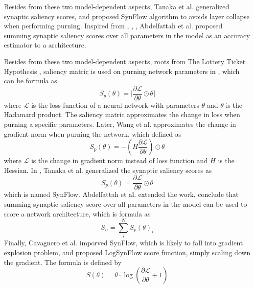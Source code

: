 \documentclass[sigconf]{acmart}
\begin{document}
    Besides from these two model-dependent aspects, Tanaka et al. \cite{tanaka2020pruning} 
    generalized synaptic saliency scores, and proposed SynFlow algorithm to avoids layer 
    collapse when performing purning. 
    Inspired from \cite{tanaka2020pruning}, \cite{wang2020picking}, \cite{lee2019snip}, 
    Abdelfattah et al. \cite{abdelfattah2021zerocost} proposed summing synaptic saliency scores 
    over all parameters in the model as an accuracy estimator to a architecture.

    Besides from these two model-dependent aspects, roots from The Lottery Ticket Hypothesis 
    \cite{frankle2019lottery}, saliency matric is used on purning network parameters in 
    \cite{lee2019snip}, which can be formula as 
    \begin{equation}
        \label{equ:snip}
        S_p(\theta)=\lvert\frac{\partial \mathcal L}{\partial \theta}\odot\theta\rvert
    \end{equation}
    where $\mathcal L$ is the loss function of a neural network with parameters $\theta$ 
    and $\theta$ is the Hadamard product. 
    The saliency matric approximates the change in loss when purning a specific parameters.
    Later, Wang et al. \cite{wang2020picking} approximates the change in gradient norm when 
    purning the network, which defined as 
    \begin{equation}
        \label{equ:grap}
        S_p(\theta)=-(H\frac{\partial \mathcal L}{\partial \theta})\odot\theta
    \end{equation}
    where $\mathcal L$ is the change in gradient norm instead of loss function and $H$ is 
    the Hessian. 
    In \cite{tanaka2020pruning}, Tanaka et al. generalized the synaptic saliency scores as 
    \begin{equation}
        \label{equ:synflow}
        S_p(\theta)=\frac{\partial \mathcal L}{\partial \theta}\odot\theta
    \end{equation}
    which is named SynFlow. 
    Abdelfattah et al. \cite{abdelfattah2021zerocost} extended the work, conclude that summing 
    synaptic saliency score over all parameters in the model can be used to score a network 
    architecture, which is formula as
    \begin{equation}
        \label{equ:zero_cost}
        S_n=\sum^N_i S_p(\theta)_i
    \end{equation}
    Finally, Cavagnero et al. \cite{Cavagnero_2023} imporved SynFlow, which is likely to fall into 
    gradient explosion problem, and proposed LogSynFlow score function, simply scaling down the gradient. 
    The formula is defined by 
    \begin{equation}
        \label{equ:logsynflow}
        S(\theta)=\theta\cdot\log(\frac{\partial \mathcal L}{\partial \theta}+1)
    \end{equation}
\end{document}
